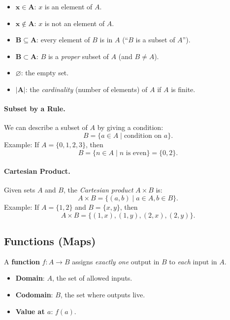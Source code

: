 \documentclass[12pt]{article}
\theoremstyle{definition}
\begin{document}
\begin{itemize}
    \item \(\mathbf{x \in A}\): \(x\) is an element of \(A\).
    \item \(\mathbf{x \notin A}\): \(x\) is not an element of \(A\).
    \item \(\mathbf{B \subseteq A}\): every element of \(B\) is in \(A\) (``\(B\) is a subset of \(A\)'').
    \item \(\mathbf{B \subset A}\): \(B\) is a \emph{proper} subset of \(A\) (and \(B \neq A\)).
    \item \(\mathbf{\varnothing}\): the empty set.
    \item \(\mathbf{|A|}\): the \emph{cardinality} (number of elements) of \(A\) if \(A\) is finite.
\end{itemize}

\paragraph{Subset by a Rule.}  
We can describe a subset of \(A\) by giving a condition:
\[
B = \{ a \in A \mid \text{condition on } a \}.
\]
Example: If \(A = \{0,1,2,3\}\), then
\[
B = \{ n \in A \mid n \text{ is even} \} = \{0, 2\}.
\]

\paragraph{Cartesian Product.}  
Given sets \(A\) and \(B\), the \emph{Cartesian product} \(A \times B\) is:
\[
A \times B = \{ (a,b) \mid a \in A, b \in B \}.
\]
Example: If \(A = \{1,2\}\) and \(B = \{x,y\}\), then
\[
A \times B = \{(1,x), (1,y), (2,x), (2,y)\}.
\]

\subsection*{Functions (Maps)}

A \textbf{function} \(f: A \to B\) assigns \emph{exactly one} output in \(B\) to \emph{each} input in \(A\).

\begin{itemize}
    \item \textbf{Domain}: \(A\), the set of allowed inputs.
    \item \textbf{Codomain}: \(B\), the set where outputs live.
    \item \textbf{Value at \(a\)}: \(f(a)\).
\end{itemize}
\end{document}
